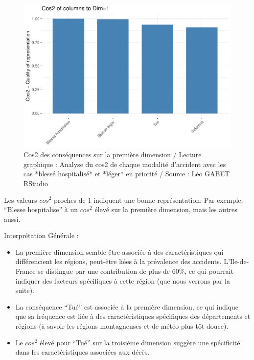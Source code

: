 \documentclass[french,]{compterendu}
\theoremstyle{urcastyle}
\theoremstyle{remark}
\begin{document}
\begin{figure}[H]

{\centering \includegraphics[width=0.9\linewidth]{Rapport_ADD_LEO-GABET_files/figure-latex/afc3-1} 

}

\caption{Cos2 des conséquences sur la première dimension / Lecture graphique : Analyse du cos2 de chaque modalité d'accident avec les cas *blessé hospitalisé* et *léger* en priorité / Source : Léo GABET RStudio}\label{fig:afc3}
\end{figure}

Les valeurs \(cos^2\) proches de 1 indiquent une bonne représentation. Par exemple, ``Blesse hospitalise'' à un \(cos^2\) élevé sur la première dimension, mais les autres aussi.

Interprétation Générale :

\begin{itemize}
\item
  La première dimension semble être associée à des caractéristiques qui différencient les régions, peut-être liées à la prévalence des accidents. L'Ile-de-France se distingue par une contribution de plus de 60\%, ce qui pourrait indiquer des facteurs spécifiques à cette région (que nous verrons par la suite).
\item
  La conséquence ``Tué'' est associée à la première dimension, ce qui indique que sa fréquence est liée à des caractéristiques spécifiques des départements et régions (à savoir les régions montagneuses et de météo plus tôt douce).
\item
  Le \(cos^2\) élevé pour ``Tué'' sur la troisième dimension suggère une spécificité dans les caractéristiques associées aux décès.
\end{itemize}
\end{document}
